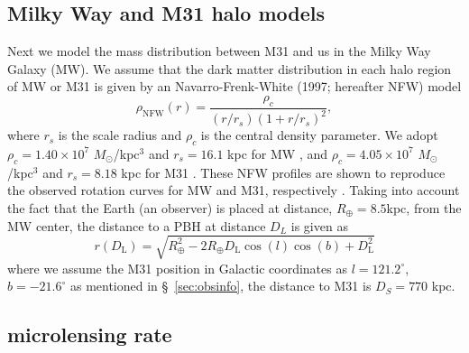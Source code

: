 \documentclass[iop, apj]{emulateapj}
\newcommand{\?}{\stackrel{?}{=}}
\begin{document}
\subsection{Milky Way and M31 halo models}
Next we model the mass distribution between M31 and us in the Milky Way Galaxy (MW). We assume that the dark matter distribution in each halo region of MW or M31 is given by an Navarro-Frenk-White (1997; hereafter NFW) model
%
\begin{equation}
\rho_\mathrm{NFW}(r)= \frac{\rho_{c}}{(r/r_{s})(1+r/r_{s})^2},
\label{eq:rho_nfwm}
\end{equation}
%
where $r_s$ is the scale radius and $\rho_c$ is the central density parameter. We adopt $\rho_{c}=1.40\times10^7$ $M_\odot$/kpc$^3$ and $r_s=16.1$ kpc for MW \citep{NestiSalucci:13}, and $\rho_{c}=4.05\times10^7$ $M_\odot$/kpc$^3$ and $r_s=8.18$ kpc for M31 \citep{Geehanetal:06}. These NFW profiles are shown to reproduce the observed rotation curves for MW and M31, respectively \citep{Klypinetal:02}. Taking into account the fact that the Earth (an observer) is placed at distance, $R_\oplus=8.5$kpc, from the MW center, the distance to a PBH at distance $D_L$ is given as 
%
\begin{equation}
r(D_\mathrm{L})=\sqrt{R_\oplus^2-2R_\oplus D_\mathrm{L}\cos(l)\cos(b)+D^2_\mathrm{L}}
\label{eq:dislens}
\end{equation}
%
where we assume the M31 position in Galactic coordinates as $l = 121.2^{\circ}$, $b = -21.6^{\circ}$ as mentioned in \S~\ref{sec:obsinfo}, the distance to M31 is $D_S=770$ kpc. 

\subsection{microlensing rate}
\end{document}
